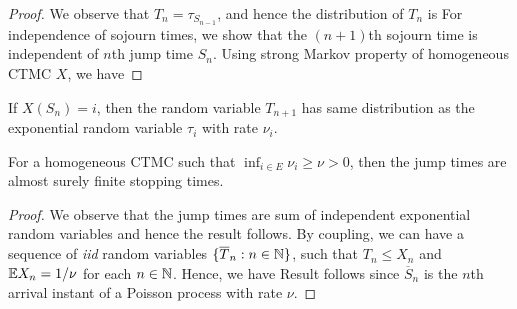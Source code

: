 \documentclass[a4paper,10pt,english]{article}
\begin{document}
\begin{proof}
We observe that $T_n = \tau_{S_{n-1}}$, and hence the distribution of $T_n$ is 
For independence of sojourn times, we show that the $(n+1)$th sojourn time is independent of $n$th jump time $S_n$. 
Using strong Markov property of homogeneous CTMC $X$, we have 
\end{proof}
\begin{cor}
If $X(S_{n}) = i$, then the random variable $T_{n+1}$ has same distribution as the exponential random variable $\tau_{i}$ with rate $\nu_i$. 
\end{cor}
\begin{prop} 
For a homogeneous CTMC such that $\inf_{i \in E} \nu_i \geq \nu > 0$, then the jump times are almost surely finite stopping times. 
\end{prop}
\begin{proof}
We observe that the jump times are sum of independent exponential random variables and hence the result follows. 
By coupling, we can have a sequence of \textit{iid} random variables $\{\overline{T}_n: n \in \mathbb{N}\}$, 
such that $T_n \leq X_n$ and $\mathbb{E} X_n = 1/\nu$ for each $n \in \mathbb{N}$. 
Hence, we have 
Result follows since $\overline{S}_n$ is the $n$th arrival instant of a Poisson process with rate $\nu$. 
\end{proof}
\end{document}
